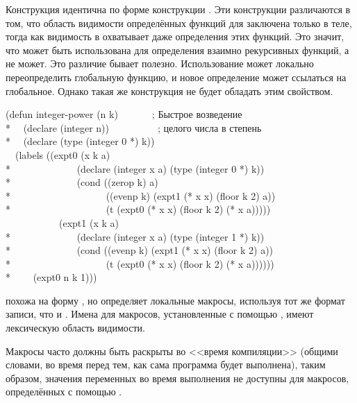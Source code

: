 \begin{defmac}
Конструкция  идентична по форме конструкции .
Эти конструкции различаются в том, что область видимости определённых функций
для  заключена только в теле, тогда как видимость в 
охватывает даже определения этих функций. Это значит, что  может
быть использована для определения взаимно рекурсивных функций, а  не
может. Это различие бывает полезно. Использование  может локально
переопределить глобальную функцию, и новое определение может ссылаться на
глобальное. Однако такая же конструкция  не будет обладать этим
свойством.
\begin{lisp}
(defun integer-power (n k)~~~~~~~; Быстрое возведение \\*
~~(declare (integer n))~~~~~~~~~~; целого числа в степень \\*
~~(declare (type (integer 0 *) k)) \\
~~(labels ((expt0 (x k a) \\*
~~~~~~~~~~~~~(declare (integer x a) (type (integer 0 *) k)) \\*
~~~~~~~~~~~~~(cond ((zerop k) a) \\*
~~~~~~~~~~~~~~~~~~~((evenp k) (expt1 (* x x) (floor k 2) a)) \\*
~~~~~~~~~~~~~~~~~~~(t (expt0 (* x x) (floor k 2) (* x a))))) \\
~~~~~~~~~~~(expt1 (x k a) \\*
~~~~~~~~~~~~~(declare (integer x a) (type (integer 1 *) k)) \\*
~~~~~~~~~~~~~(cond ((evenp k) (expt1 (* x x) (floor k 2) a)) \\*
~~~~~~~~~~~~~~~~~~~(t (expt0 (* x x) (floor k 2) (* x a)))))) \\*
~~~~(expt0 n k 1)))
\end{lisp}

 похожа на форму , но определяет локальные макросы,
используя тот же формат записи, что и .
Имена для макросов, установленные с помощью , имеют лексическую
область видимости.

Макросы часто должны быть раскрыты во <<время компиляции>> (общими словами,
во время перед тем, как сама программа будет выполнена), таким образом, значения
переменных во время выполнения не доступны для макросов, определённых с помощью
.


\end{defmac}
